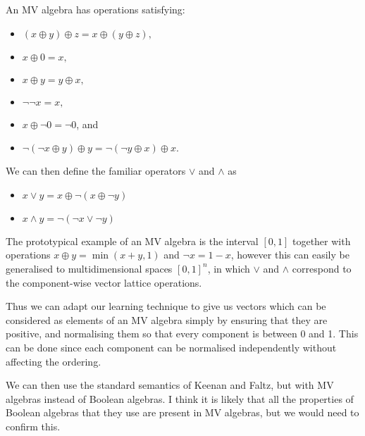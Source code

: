 \documentclass{article}
\begin{document}
An MV algebra has operations satisfying:
\begin{itemize}
\item $(x \oplus y) \oplus z = x \oplus (y \oplus z),$
\item $x \oplus 0 = x,$
\item $x \oplus y = y \oplus x,$
\item $\lnot \lnot x = x,$
\item $x \oplus \lnot 0 = \lnot 0$, and
\item $\lnot ( \lnot x \oplus y)\oplus y = \lnot ( \lnot y \oplus x)\oplus x.$
\end{itemize}
We can then define the familiar operators $\lor$ and $\land$ as
\begin{itemize}
\item $x\lor y = x\oplus \lnot(x\oplus\lnot y)$
\item $x\land y = \lnot (\lnot x \lor \lnot y)$
\end{itemize}

The prototypical example of an MV algebra is the interval $[0,1]$
together with operations $x \oplus y = \min(x+y, 1)$ and $\lnot x = 1
- x$, however this can easily be generalised to multidimensional
spaces $[0,1]^n$, in which $\lor$ and $\land$ correspond to the
component-wise vector lattice operations.

Thus we can adapt our learning technique to give us vectors which can
be considered as elements of an MV algebra simply by ensuring that
they are positive, and normalising them so that every component is
between 0 and 1. This can be done since each component can be
normalised independently without affecting the ordering.

We can then use the standard semantics of Keenan and Faltz, but with
MV algebras instead of Boolean algebras. I think it is likely that all
the properties of Boolean algebras that they use are present in MV
algebras, but we would need to confirm this.
\end{document}
